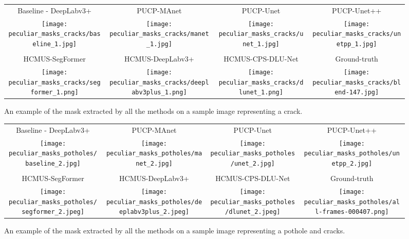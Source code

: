 \documentclass[twocolumn]{article}
\newcommand{\PUCP}[0]{PUCP}\newcommand{\HCMUS}[0]{HCMUS}\newcommand{\baseline}[0]{Baseline}
\begin{document}
\begin{figure*}[t]
    \centering
    \footnotesize
    \begin{tabular}{|c|c|c|c|}
        \hline
        \baseline{} - DeepLabv3+	&\PUCP{}-MAnet	&\PUCP{}-Unet	&\PUCP{}-Unet++ \\	
        \texttt{[image: peculiar\_masks\_cracks/baseline\_1.jpg]}&
        \texttt{[image: peculiar\_masks\_cracks/manet\_1.jpg]}&
        \texttt{[image: peculiar\_masks\_cracks/unet\_1.jpg]}&
        \texttt{[image: peculiar\_masks\_cracks/unetpp\_1.jpg]}\\ \hline
        \multicolumn{4}{c}{ }\\ \hline
        \HCMUS{}-SegFormer	&\HCMUS{}-DeepLabv3+	&\HCMUS{}-CPS-DLU-Net & Ground-truth\\
        \texttt{[image: peculiar\_masks\_cracks/segformer\_1.png]}&
        \texttt{[image: peculiar\_masks\_cracks/deeplabv3plus\_1.png]}&
        \texttt{[image: peculiar\_masks\_cracks/dlunet\_1.png]} & 
         \texttt{[image: peculiar\_masks\_cracks/blend-147.jpg]}\\ \hline
    \end{tabular}
    \normalsize
    \caption{An example of the mask extracted by all the methods on a sample image representing a crack.}
    \label{fig:peculiar-masks-cracks}
\end{figure*}
\begin{figure*}[t]
    \centering
    \footnotesize
    \begin{tabular}{|c|c|c|c|}
        \hline
        \baseline{} - DeepLabv3+	&\PUCP{}-MAnet	&\PUCP{}-Unet	&\PUCP{}-Unet++ \\	
        \texttt{[image: peculiar\_masks\_potholes/baseline\_2.jpg]}&
        \texttt{[image: peculiar\_masks\_potholes/manet\_2.jpg]}&
        \texttt{[image: peculiar\_masks\_potholes/unet\_2.jpg]}&
        \texttt{[image: peculiar\_masks\_potholes/unetpp\_2.jpg]}\\ \hline
        \multicolumn{4}{c}{ }\\  \hline
        \HCMUS{}-SegFormer	&\HCMUS{}-DeepLabv3+	&\HCMUS{}-CPS-DLU-Net & Ground-truth\\
        \texttt{[image: peculiar\_masks\_potholes/segformer\_2.jpeg]}&
        \texttt{[image: peculiar\_masks\_potholes/deeplabv3plus\_2.jpeg]}&
        \texttt{[image: peculiar\_masks\_potholes/dlunet\_2.jpeg]} & 
        \texttt{[image: peculiar\_masks\_potholes/all-frames-000407.png]}\\ \hline
    \end{tabular}
    \normalsize
    \caption{An example of the mask extracted by all the methods on a sample image representing a pothole and cracks.}
    \label{fig:peculiar-masks-potholes}
\end{figure*}
\end{document}

